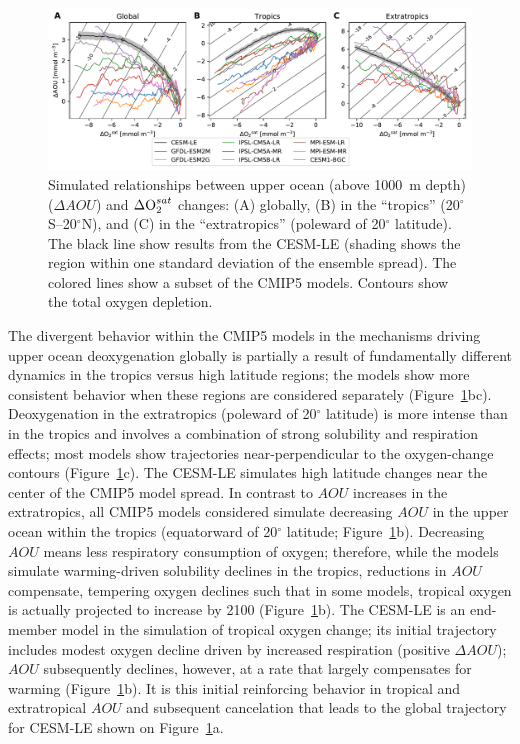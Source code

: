 \documentclass[draft,linenumbers]{report_chapter}
\begin{document}
\begin{figure}[tbp]
\centering
\includegraphics[width=1\textwidth]{aou-o2sat-phase-diag.pdf}
\caption{Simulated relationships between upper ocean (above 1000~m depth) ($\Delta{}AOU$) and $\Delta\ce{O2}^{sat}$ changes: (A) globally, (B) in the ``tropics'' (20$^\circ$S--20$^\circ$N), and (C) in the ``extratropics'' (poleward of 20$^\circ$ latitude).
The black line show results from the CESM-LE (shading shows the region within one standard deviation of the ensemble spread).
The colored lines show a subset of the CMIP5 models.
Contours show the total oxygen depletion.
}
\label{fig:aou-o2sat-phase}
\end{figure}

The divergent behavior within the CMIP5 models in the mechanisms driving upper ocean deoxygenation globally is partially a result of fundamentally different dynamics in the tropics versus high latitude regions; the models show more consistent behavior when these regions are considered separately (Figure~\ref{fig:aou-o2sat-phase}bc).
Deoxygenation in the extratropics (poleward of 20$^\circ$ latitude) is more intense than in the tropics and involves a combination of strong solubility and respiration effects; most models show trajectories near-perpendicular to the oxygen-change contours (Figure~\ref{fig:aou-o2sat-phase}c).
The CESM-LE simulates high latitude changes near the center of the CMIP5 model spread.
In contrast to $AOU$ increases in the extratropics, all CMIP5 models considered simulate decreasing $AOU$ in the upper ocean within the tropics (equatorward of 20$^\circ$ latitude; Figure~\ref{fig:aou-o2sat-phase}b).
Decreasing $AOU$ means less respiratory consumption of oxygen; therefore, while the models simulate warming-driven solubility declines in the tropics, reductions in $AOU$ compensate, tempering oxygen declines such that in some models, tropical oxygen is actually projected to increase by 2100 (Figure~\ref{fig:aou-o2sat-phase}b).
The CESM-LE is an end-member model in the simulation of tropical oxygen change; its initial trajectory includes modest oxygen decline driven by increased respiration (positive $\Delta{}AOU$); $AOU$ subsequently declines, however, at a rate that largely compensates for warming (Figure~\ref{fig:aou-o2sat-phase}b).
It is this initial reinforcing behavior in tropical and extratropical $AOU$ and subsequent cancelation that leads to the global trajectory for CESM-LE shown on Figure~\ref{fig:aou-o2sat-phase}a.
\end{document}
